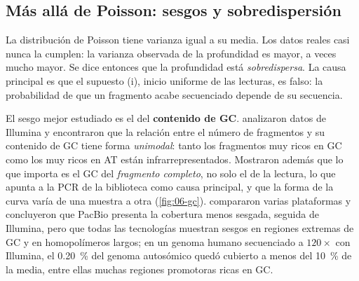 \subsection{Más allá de Poisson: sesgos y sobredispersión}

La distribución de Poisson tiene varianza igual a su media. Los datos reales casi nunca la cumplen: la varianza observada de la profundidad es mayor, a veces mucho mayor. Se dice entonces que la profundidad está \emph{sobredispersa}. La causa principal es que el supuesto (i), inicio uniforme de las lecturas, es falso: la probabilidad de que un fragmento acabe secuenciado depende de su secuencia.

El sesgo mejor estudiado es el del \textbf{contenido de GC}. \textcite{c06-benjamini2012} analizaron datos de Illumina y encontraron que la relación entre el número de fragmentos y su contenido de GC tiene forma \emph{unimodal}: tanto los fragmentos muy ricos en GC como los muy ricos en AT están infrarrepresentados. Mostraron además que lo que importa es el GC del \emph{fragmento completo}, no solo el de la lectura, lo que apunta a la PCR de la biblioteca como causa principal, y que la forma de la curva varía de una muestra a otra (\cref{fig:06-gc}). \textcite{c06-ross2013} compararon varias plataformas y concluyeron que PacBio presenta la cobertura menos sesgada, seguida de Illumina, pero que todas las tecnologías muestran sesgos en regiones extremas de GC y en homopolímeros largos; en un genoma humano secuenciado a $120\times$ con Illumina, el \SI{0,20}{\percent} del genoma autosómico quedó cubierto a menos del \SI{10}{\percent} de la media, entre ellas muchas regiones promotoras ricas en GC.


